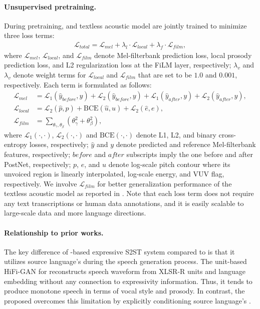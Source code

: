 \paragraph{Unsupervised pretraining.}
During pretraining, \ptvenc and textless acoustic model are jointly trained to minimize three loss terms:
\begin{align}
    \mathcal{L}_{total} = \mathcal{L}_{mel} + \lambda_{l} \cdot \mathcal{L}_{local} + \lambda_{f} \cdot \mathcal{L}_{film},\label{eq:expressive:ptv}
\end{align}
where $\mathcal{L}_{mel}$, $\mathcal{L}_{local}$, and $\mathcal{L}_{film}$ denote Mel-filterbank prediction loss, local prosody prediction loss, and L2 regularization loss at the FiLM layer, respectively; $\lambda_{v}$ and $\lambda_{v}$ denote weight terms for $\mathcal{L}_{local}$ and $\mathcal{L}_{film}$ that are set to be $1.0$ and $0.001$, respectively.
Each term is formulated as follows:
\begin{align}
    \mathcal{L}_{mel} &= \mathcal{L}_1(\hat{{y}}_{before}, {y}) + \mathcal{L}_2(\hat{{y}}_{before}, {y}) + \mathcal{L}_1(\hat{{y}}_{after}, {y}) + \mathcal{L}_2(\hat{{y}}_{after}, {y}), \\
    \mathcal{L}_{local} &= \mathcal{L}_2(\hat{{p}}, {p}) + \text{BCE}(\hat{{u}}, {u}) + \mathcal{L}_2(\hat{{e}}, {e}), \\
    \mathcal{L}_{film} &= \sum_{\theta_{\gamma},\theta_{\beta}}\left(\theta_{\gamma}^2 + \theta_{\beta}^2\right),
\end{align}
where $\mathcal{L}_1(\cdot, \cdot)$, $\mathcal{L}_2(\cdot, \cdot)$ and $\text{BCE}(\cdot, \cdot)$ denote L1, L2, and binary cross-entropy losses, respectively; $\hat{{y}}$ and ${y}$ denote predicted and reference Mel-filterbank features, respectively; $before$ and $after$ subscripts imply the one before and after PostNet, respectively; ${p}$, ${e}$, and ${u}$ denote log-scale pitch contour where its unvoiced region is linearly interpolated, log-scale energy, and VUV flag, respectively.
We involve $\mathcal{L}_{film}$ for better generalization performance of the textless acoustic model as reported in \citet{boris2018tadam}.
Note that each loss term does not require any text transcriptions or human data annotations, and it is easily scalable to large-scale data and more language directions.

\paragraph{Relationship to prior works.}
 The key difference of \ptv-based expressive S2ST system compared to \mfourttwo is that it utilizes source language's \ptvemb during the speech generation process.
The unit-based HiFi-GAN for \mfourttwo reconstructs speech waveform from XLSR-R units and language embedding without any connection to expressivity information.
Thus, it tends to produce monotone speech in terms of vocal style and prosody.
In contrast, the proposed \ptv overcomes this limitation by explicitly conditioning source language's \ptvemb.

